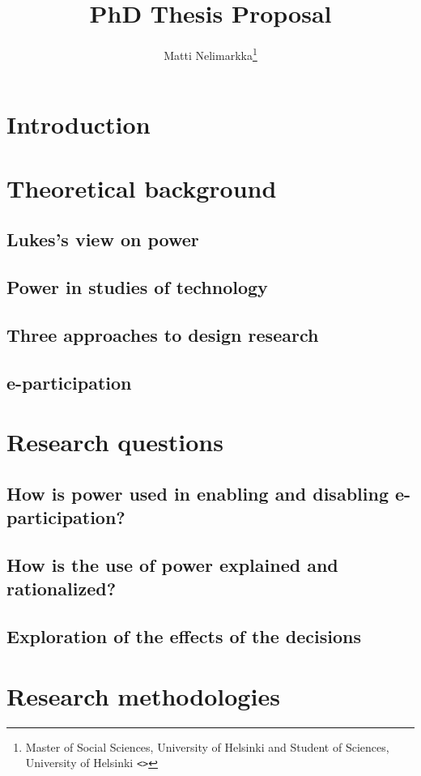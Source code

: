 \documentclass[12pt,a4paper]{article}
\author{Matti Nelimarkka\footnote{Master of Social Sciences, University of Helsinki and Student of Sciences, University of Helsinki \texttt{<\email{matti.nelimarkka@hiit.fi}>}}}
\title{PhD Thesis Proposal}
\begin{document}
\maketitle

\tableofcontents

\newpage

\section{Introduction}

\section{Theoretical background}

\subsection{Lukes's view on power}

\subsection{Power in studies of technology}

\subsection{Three approaches to design research}

\subsection{e-participation}

\section{Research questions}

\subsection{How is power used in enabling and disabling e-participation?}

\subsection{How is the use of power explained and rationalized?}

\subsection{Exploration of the effects of the decisions}

\section{Research methodologies}
\end{document}
